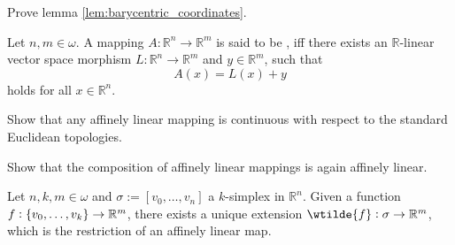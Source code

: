 \begin{exercise}
	Prove lemma \ref{lem:barycentric_coordinates}.
\end{exercise}

\begin{definition}
	Let $n,m \in \omega$. A mapping $A : \mathbb{R}^n \to \mathbb{R}^m$ is said to be , iff there exists an $\mathbb{R}$-linear vector space morphism $L : \mathbb{R}^n \to \mathbb{R}^m$ and $y \in \mathbb{R}^m$, such that 
	\begin{equation*}
		A(x) = L(x) + y
	\end{equation*}
	\noindent holds for all $x \in \mathbb{R}^n$.
\end{definition}

\begin{exercise}
	\label{ex:continuity_affine_map}
	Show that any affinely linear mapping is continuous with respect to the standard Euclidean topologies.
\end{exercise}

\begin{exercise}
	\label{ex:affinely_linear}
	Show that the composition of affinely linear mappings is again affinely linear.
\end{exercise}

\begin{proposition}
	\label{prop:affine_map_induced_by_vertex_map}
	Let $n,k,m \in \omega$ and $\sigma := [v_0,\dots,v_n]$ a $k$-simplex in $\mathbb{R}^n$. Given a function $f : \cbr{v_0,\dots,v_k} \to \mathbb{R}^m$, there exists a unique extension $\wtilde{f} : \sigma \to \mathbb{R}^m$, which is the restriction of an affinely linear map.
\end{proposition}

